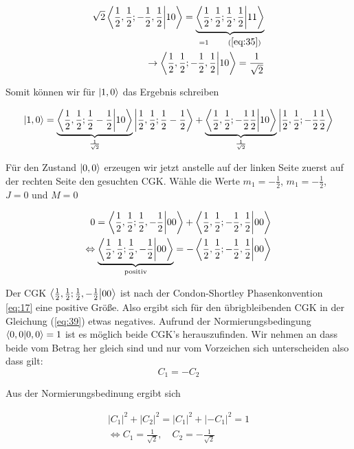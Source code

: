 \begin{align}
  \label{eq:37}
  \sqrt{2}\braket{\frac{1}{2},\frac{1}{2};-\frac{1}{2},\frac{1}{2}}{10}= \underbr{ \braket{\frac{1}{2},\frac{1}{2};\frac{1}{2},\frac{1}{2}}{11}}_{=1 \qquad (\ref{eq:35})}  \\
\rightarrow \braket{\frac{1}{2},\frac{1}{2};-\frac{1}{2},\frac{1}{2}}{10}=\frac{1}{\sqrt{2}}
\end{align}


Somit können wir für \(\left| 1,0 \right\rangle\) das Ergebnis schreiben

\begin{equation}
  \label{eq:38}
  \ket{1,0} = \underbr{\braket{\frac{1}{2},\frac{1}{2};\frac{1}{2}-\frac{1}{2}}{10}}_{\frac{1}{\sqrt{2}}}\ket{ \frac{1}{2},\frac{1}{2};\frac{1}{2}-\frac{1}{2} }  +\underbr{\braket{\frac{1}{2},\frac{1}{2};-\frac{1}{2}\frac{1}{2}}{10}}_{\frac{1}{\sqrt{2}}}\ket{\frac{1}{2},\frac{1}{2};-\frac{1}{2}\frac{1}{2}} 
\end{equation}


Für den Zustand \(\left| 0,0 \right\rangle\) erzeugen wir jetzt anstelle auf der linken Seite zuerst auf der rechten Seite den gesuchten CGK. Wähle die Werte  \(m_1=-\frac{1}{2}\), \(m_1=-\frac{1}{2}\), \(J=0\) und \(M=0\)

\begin{align}
  \label{eq:39}
  0 = \braket{\frac{1}{2},\frac{1}{2};\frac{1}{2},-\frac{1}{2}}{00} +  \braket{\frac{1}{2},\frac{1}{2};-\frac{1}{2},\frac{1}{2}}{00}\\
\Leftrightarrow \underbr{\braket{\frac{1}{2},\frac{1}{2};\frac{1}{2},-\frac{1}{2}}{00}}_{\text{positiv}} = -\braket{\frac{1}{2},\frac{1}{2};-\frac{1}{2},\frac{1}{2}}{00}
\end{align}

Der CGK \(\braket{\frac{1}{2},\frac{1}{2};\frac{1}{2},-\frac{1}{2}}{00} \) ist nach der Condon-Shortley
  Phasenkonvention \eqref{eq:17} eine positive Größe. Also ergibt sich für den übrigbleibenden CGK in der Gleichung (\ref{eq:39}) etwas negatives. Aufrund der Normierungsbedingung \(\braket{0,0}{0,0}=1\) ist es möglich beide CGK's herauszufinden. Wir nehmen an dass beide vom Betrag her gleich sind und nur vom Vorzeichen sich unterscheiden also dass gilt:
  \begin{equation}
    \label{eq:40}
    C_1 = -C_2
  \end{equation}

Aus der Normierungsbedinung ergibt sich

\begin{align}
  \label{eq:41}
  |C_1|^2 + |C_2|^2 =  |C_1|^2 + |-C_1|^2 = 1 \\
\Leftrightarrow C_1 = \frac{1}{\sqrt{2}}, \quad C_2 = -\frac{1}{\sqrt{2}}
\end{align}


